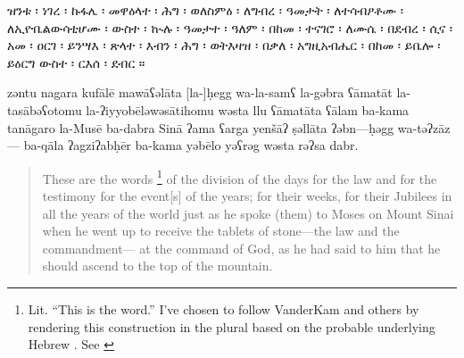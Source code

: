 \clearpage
\begin{ethiopictext}
        ዝንቱ ፡ ነገረ ፡ ኩፋሌ ፡
        መዋዕላተ ፡ ሕግ ፡ ወለስምዕ ፡
        ለግብረ ፡ ዓመታት ፡ ለተሳብዖቶሙ ፡ 
        ለኢዮቤልውሳቲሆሙ ፡ ውስተ ፡ ኲሉ ፡ ዓመታተ ፡ ዓለም ፡
        በከመ ፡ ተናገሮ ፡ ለሙሴ ፡ በደብረ ፡ ሲና ፡
        አመ ፡ ዐርገ ፡ ይንሣእ ፡ ጽላተ ፡ እብን ፡ ሕግ ፡ ወትእዛዝ ፡ 
        በቃለ ፡ አግዚአብሔር ፡ በከመ ፡ ይቤሎ ፡ ይዕርግ ውስተ ፡ ርእሰ ፡ ደብር ።
\end{ethiopictext}


\begin{transliteration}
        zəntu nagara kufālē
        mawāʕəlāta [la-]ḥegg wa-la-samʕ
        la-gəbra ʕāmatāt la-tasābəʕotomu
        la-ʔiyyobēləwəsātihomu wəsta llu ʕāmatāta ʕālam
        ba-kama tanāgaro la-Musē ba-dabra Sinā
        ʔama ʕarga yenšāʔ ṣəllāta ʔəbn---ḥəgg wa-təʔzāz---%
        ba-qāla ʔagziʔabḥēr ba-kama yəbēlo yəʕrəg wəsta rəʔsa dabr.
\end{transliteration}

\begin{quote}
        These are the words%
        \footnote{Lit. ``This is the word.'' I've chosen to follow VanderKam and others by rendering this construction in the plural based on the probable underlying Hebrew . See \cite[125]{vanderkam2018}}
        of the division 
        of the days for the law and for the testimony
        for the event[s] of the years; for their weeks,
        for their Jubilees in all the years of the world
        just as he spoke (them) to Moses on Mount Sinai 
        when he went up to receive the tablets of stone---the law and the commandment---%
        at the command of God, as he had said to him 
        that he should ascend to the top of the mountain.
\end{quote}
%


